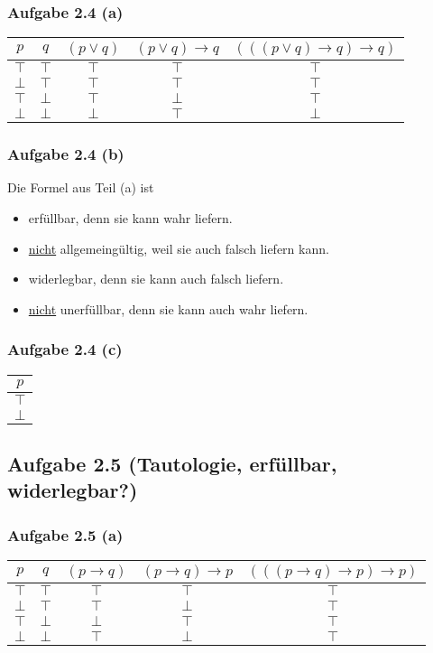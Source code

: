 \subsubsection{Aufgabe 2.4 (a)}
\begin{tabular}{c|c||c|c|c}
	$p$ & $q$ & $(p\vee q)$ & $(p\vee q)\to q$ & $(((p\vee q)\to q)\to q)$\\ \hline
	$\top$ & $\top$ & $\top$ & $\top$ & $\top$\\
	$\bot$ & $\top$ & $\top$ & $\top$ & $\top$\\
	$\top$ & $\bot$ & $\top$ & $\bot$ & $\top$\\
	$\bot$ & $\bot$ & $\bot$ & $\top$ & $\bot$
\end{tabular}

\subsubsection{Aufgabe 2.4 (b)}
Die Formel aus Teil (a) ist
\begin{itemize}
	\item erfüllbar, denn sie kann wahr liefern.
	\item \underline{nicht} allgemeingültig, weil sie auch falsch liefern kann.
	\item widerlegbar, denn sie kann auch falsch liefern.
	\item \underline{nicht} unerfüllbar, denn sie kann auch wahr liefern.
\end{itemize}

\subsubsection{Aufgabe 2.4 (c)}
\begin{tabular}{c}
	$p$\\ \hline
	$\top$\\
	$\bot$
\end{tabular}

\subsection{Aufgabe 2.5 (Tautologie, erfüllbar, widerlegbar?)}
\subsubsection{Aufgabe 2.5 (a)}
\begin{tabular}{c|c||c|c|c}
	$p$ & $q$ & $(p\to q)$ & $(p\to q)\to p$ & $(((p\to q)\to p)\to p)$\\ \hline
	$\top$ & $\top$ & $\top$ & $\top$ & $\top$ \\
	$\bot$ & $\top$ & $\top$ & $\bot$ & $\top$ \\
	$\top$ & $\bot$ & $\bot$ & $\top$ & $\top$\\
	$\bot$ & $\bot$ & $\top$ & $\bot$ & $\top$\\
\end{tabular}

